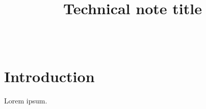 \documentclass[TN]{spherex}
\title{Technical note title}
\author{
  \person[email=galileo@example.com]{Galileo~Galilei} \\
  \person{Isaac~Newton}
}
\begin{document}
\maketitle

\section{Introduction}

Lorem ipsum.
\end{document}
